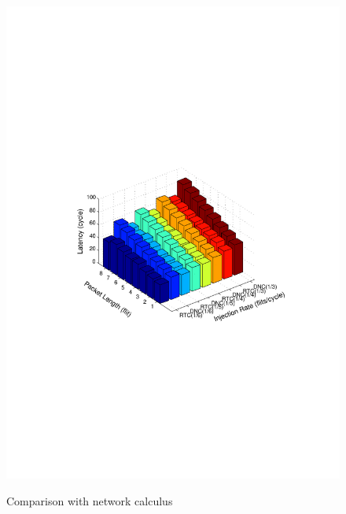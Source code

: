 \documentclass[10pt,journal]{IEEEtran}
\begin{document}
\begin{figure}
  \centering
  \includegraphics[scale=0.65]{figures/comparison.pdf}\\
  \caption{Comparison with network calculus}\label{comparison}
\end{figure}
\end{document}
